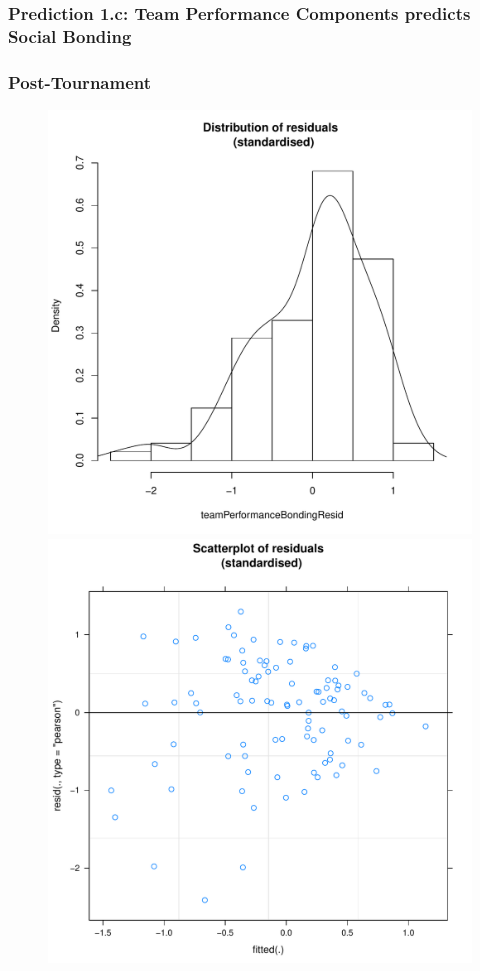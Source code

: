 \begin{CJK}{UTF8}{gbsn}
       \subsubsection{Prediction 1.c: Team Performance Components predicts Social Bonding}


            \subsubsection{Post-Tournament}

                


            \begin{figure}[htbp]
              \includegraphics[scale =.4]{images/MLM3aHist.pdf}
              \includegraphics[scale =.4]{images/MLM3aScatter.pdf}

\end{figure}
\end{CJK}
